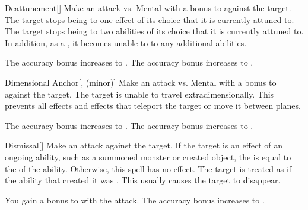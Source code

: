 \lowercase{\hypertarget{spell:Deattunement}{}}\label{spell:Deattunement}
\begin{freeability}[Rank 3]{\hypertarget{spell:Deattunement}{Deattunement}}[]
Make an attack vs. Mental with a  bonus to  against the target.
\hit The target stops being  to one effect of its choice that it is currently attuned to.
\crit The target stops being  to two abilities of its choice that it is currently attuned to.
In addition, as a , it becomes unable to  to any additional abilities.

\rankline
{} The accuracy bonus increases to .
 The accuracy bonus increases to .
\end{freeability}
\vspace{0.25em}



\lowercase{\hypertarget{spell:Dimensional Anchor}{}}\label{spell:Dimensional Anchor}
\begin{freeability}[Rank 3]{\hypertarget{spell:Dimensional Anchor}{Dimensional Anchor}}[,  (minor)]
Make an attack vs. Mental with a  bonus to  against the target.
\hit The target is unable to travel extradimensionally.
This prevents all  effects and effects that teleport the target or move it between planes.

\rankline
{} The accuracy bonus increases to .
 The accuracy bonus increases to .
\end{freeability}
\vspace{0.25em}



\lowercase{\hypertarget{spell:Dismissal}{}}\label{spell:Dismissal}
\begin{freeability}[Rank 3]{\hypertarget{spell:Dismissal}{Dismissal}}[]
Make an attack against the target.
If the target is an effect of an ongoing  ability, such as a summoned monster or created object, the  is equal to the  of the ability.
Otherwise, this spell has no effect.
\hit The target is treated as if the ability that created it was .
This usually causes the target to disappear.

\rankline
{} You gain a  bonus to  with the attack.
 The accuracy bonus increases to .
\end{freeability}
\vspace{0.25em}



